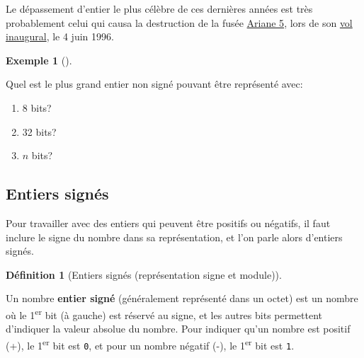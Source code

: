 \documentclass[
  letterpaper,
]{scrbook}
\providecommand{\tightlist}{%
  \setlength{\itemsep}{0pt}\setlength{\parskip}{0pt}}\usepackage{longtable,booktabs,array}
\theoremstyle{plain}
\theoremstyle{definition}
\newtheorem{definition}{Définition}[chapter]
\theoremstyle{definition}
\newtheorem{example}{Exemple}[chapter]
\theoremstyle{remark}
\begin{document}
Le dépassement d'entier le plus célèbre de ces dernières années est très
probablement celui qui causa la destruction de la fusée
\href{https://www.wikiwand.com/fr/Ariane_5}{Ariane 5}, lors de son
\href{https://www.wikiwand.com/fr/Vol_501_d\textquotesingle{}Ariane_5}{vol
inaugural}, le 4 juin 1996.

\begin{example}[]\protect\hypertarget{exm-plus-grand-entier-non-signe}{}\label{exm-plus-grand-entier-non-signe}

Quel est le plus grand entier non signé pouvant être représenté avec:

\begin{enumerate}
\def\labelenumi{\alph{enumi})}
\tightlist
\item
  8 bits?
\item
  32 bits?
\item
  \(n\) bits?
\end{enumerate}

\end{example}

\hypertarget{entiers-signuxe9s}{%
\subsection{Entiers signés}\label{entiers-signuxe9s}}

Pour travailler avec des entiers qui peuvent être positifs ou négatifs,
il faut inclure le signe du nombre dans sa représentation, et l'on parle
alors d'entiers signés.

\begin{definition}[Entiers signés (représentation signe et
module)]\protect\hypertarget{def-entiers-signes}{}\label{def-entiers-signes}

Un nombre \textbf{entier signé} (généralement représenté dans un octet)
est un nombre où le 1\textsuperscript{er} bit (à gauche) est réservé au
signe, et les autres bits permettent d'indiquer la valeur absolue du
nombre. Pour indiquer qu'un nombre est positif (+), le
1\textsuperscript{er} bit est \texttt{0}, et pour un nombre négatif (-),
le 1\textsuperscript{er} bit est \texttt{1}.

\end{definition}
\end{document}
